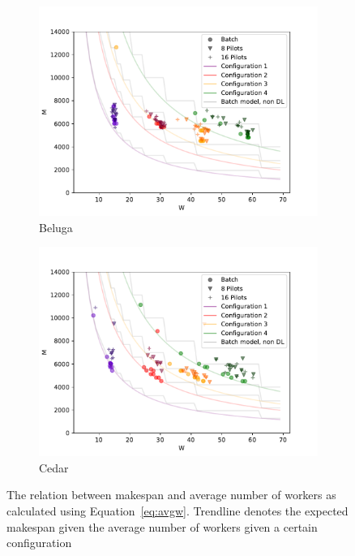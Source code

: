 	\begin{figure}
	    \centering
	    \begin{subfigure}[b]{0.475\textwidth}
		\centering
		\includegraphics[width=\textwidth]{figures/part2-chp2/mw_beluga}
		\caption[]%
		{{\small Beluga}}
		\label{fig:mwbeluga}
	    \end{subfigure}
	    \hfill
	    \begin{subfigure}[b]{0.475\textwidth}
		\centering
		\includegraphics[width=\textwidth]{figures/part2-chp2/mw_cedar}
		\caption[]%
		{{\small Cedar}}
		\label{fig:mwcedar}
	    \end{subfigure}
	    \caption{\small The relation between makespan and average number of workers as 
	    calculated using Equation~\ref{eq:avgw}. Trendline denotes the expected makespan
	    given the average number of workers given a certain configuration}
	    \label{fig:mwall}
	\end{figure}
    
